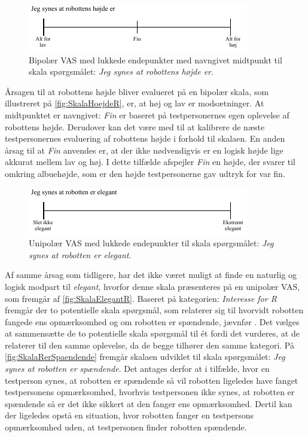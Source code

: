 %
\begin{figure}[H]
\centering
\includegraphics[width =\textwidth]{Figure/UdvalgteSkalaer/HoejdeR} 
\caption{Bipolær VAS med lukkede endepunkter med navngivet midtpunkt til skala spørgsmålet: \textit{Jeg synes at robottens højde er}.}
\label{fig:SkalaHoejdeR}
\end{figure}
\noindent
%
Årsagen til at robottens højde bliver evalueret på en bipolær skala, som illustreret på \autoref{fig:SkalaHoejdeR}, er, at høj og lav er modsætninger. At midtpunktet er navngivet: \textit{Fin} er baseret på testpersonernes egen oplevelse af robottens højde. Derudover kan det være med til at kalibrere de næste testpersonernes evaluering af robottens højde i forhold til skalaen. En anden årsag til at \textit{Fin} anvendes er, at der ikke nødvendigvis er en logisk højde lige akkurat mellem lav og høj. I dette tilfælde afspejler \textit{Fin} en højde, der svarer til omkring albuehøjde, som er den højde testpersonerne gav udtryk for var fin. 
%
\begin{figure}[H]
\centering
\includegraphics[width =\textwidth]{Figure/UdvalgteSkalaer/ElegantR} 
\caption{Unipolær VAS med lukkede endepunkter til skala spørgsmålet: \textit{Jeg synes at robotten er elegant}.}
\label{fig:SkalaElegantR}
\end{figure}
\noindent
%
Af samme årsag som tidligere, har det ikke været muligt at finde en naturlig og logisk modpart til \textit{elegant}, hvorfor denne skala præsenteres på en unipolær VAS, som fremgår af \autoref{fig:SkalaElegantR}.\blankline
%
Baseret på kategorien: \textit{Interesse for R} fremgår der to potentielle skala spørgsmål, som relaterer sig til hvorvidt robotten fangede ens opmærksomhed og om robotten er spændende, jævnfør . Det vælges at sammensætte de to potentielle skala spørgsmål til ét fordi det vurderes, at de relaterer til den samme oplevelse, da de begge tilhører den samme kategori. På \autoref{fig:SkalaRerSpaendende} fremgår skalaen udviklet til skala spørgsmålet: \textit{Jeg synes at robotten er spændende}. Det antages derfor at i tilfælde, hvor en testperson synes, at robotten er spændende så vil robotten ligeledes have fanget testpersonens opmærksomhed, hvorhvis testpersonen ikke synes, at robotten er spændende så er det ikke sikkert at den fanger ens opmærksomhed. Dertil kan der ligeledes opstå en situation, hvor robotten fanger en testpersons opmærksomhed uden, at testpersonen finder robotten spændende.

